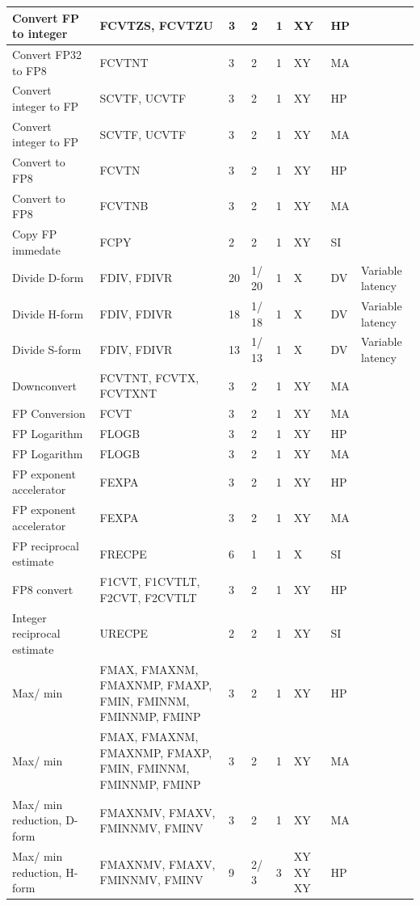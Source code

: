 \begin{longtable}{|p{1in}|p{1in}|l|l|l|p{1in}|l|p{1in}|}
\hline
Convert FP to integer & FCVTZS, FCVTZU & 3 & 2 & 1 & XY & HP & \\
\hline
Convert FP32 to FP8 & FCVTNT & 3 & 2 & 1 & XY & MA & \\
\hline
Convert integer to FP & SCVTF, UCVTF & 3 & 2 & 1 & XY & HP & \\
\hline
Convert integer to FP & SCVTF, UCVTF & 3 & 2 & 1 & XY & MA & \\
\hline
Convert to FP8 & FCVTN & 3 & 2 & 1 & XY & HP & \\
\hline
Convert to FP8 & FCVTNB & 3 & 2 & 1 & XY & MA & \\
\hline
Copy FP immedate & FCPY & 2 & 2 & 1 & XY & SI & \\
\hline
Divide D-form & FDIV, FDIVR & 20 & 1/ 20 & 1 & X & DV & Variable latency\\
\hline
Divide H-form & FDIV, FDIVR & 18 & 1/ 18 & 1 & X & DV & Variable latency\\
\hline
Divide S-form & FDIV, FDIVR & 13 & 1/ 13 & 1 & X & DV & Variable latency\\
\hline
Downconvert & FCVTNT, FCVTX, FCVTXNT & 3 & 2 & 1 & XY & MA & \\
\hline
FP Conversion & FCVT & 3 & 2 & 1 & XY & MA & \\
\hline
FP Logarithm & FLOGB & 3 & 2 & 1 & XY & HP & \\
\hline
FP Logarithm & FLOGB & 3 & 2 & 1 & XY & MA & \\
\hline
FP exponent accelerator & FEXPA & 3 & 2 & 1 & XY & HP & \\
\hline
FP exponent accelerator & FEXPA & 3 & 2 & 1 & XY & MA & \\
\hline
FP reciprocal estimate & FRECPE & 6 & 1 & 1 & X & SI & \\
\hline
FP8 convert & F1CVT, F1CVTLT, F2CVT, F2CVTLT & 3 & 2 & 1 & XY & HP & \\
\hline
Integer reciprocal estimate & URECPE & 2 & 2 & 1 & XY & SI & \\
\hline
Max/ min & FMAX, FMAXNM, FMAXNMP, FMAXP, FMIN, FMINNM, FMINNMP, FMINP & 3 & 2 & 1 & XY & HP & \\
\hline
Max/ min & FMAX, FMAXNM, FMAXNMP, FMAXP, FMIN, FMINNM, FMINNMP, FMINP & 3 & 2 & 1 & XY & MA & \\
\hline
Max/ min reduction, D-form & FMAXNMV, FMAXV, FMINNMV, FMINV & 3 & 2 & 1 & XY & MA & \\
\hline
Max/ min reduction, H-form & FMAXNMV, FMAXV, FMINNMV, FMINV & 9 & 2/ 3 & 3 & XY XY XY & HP & \\

\end{longtable}
